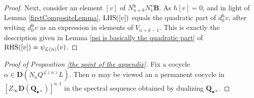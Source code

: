 \documentclass[11pt]{amsart} \renewcommand{\baselinestretch}{1.2}
\theoremstyle{plain}
\numberwithin{equation}{section} %
\theoremstyle{plain}
\numberwithin{equation}{chapter} %
\newcommand{\calL}{\mathcal{L}}
\newcommand{\EZ}[5]{[Z^{#1}_{#2}#3]^{#4}_{#5}}
\newcommand{\uver}{^\mathrm{v}}
\newcommand{\uhor}{^\mathrm{h}}
\newcommand{\dual}{\mathbf{D}}
\begin{document}
\begin{appendices}
\begin{proof}
Next, consider an element $[v]$ of $N\uhor_{n+k}N\uver_1\textbf{B}$. As $h[v]=0$, and in light of Lemma \ref{firstCompositeLemma}, $\textup{LHS}([v])$ equals the quadratic part of $d\uhor_0v$, after writing $d\uhor_0v$ as an expression in elements of $V_{n+k-1}$. This is exactly the description given in Lemma \ref{psi is basically the quadratic part} of $\textup{RHS}([v])=\psi_{\calL(n)}(v)$.
\end{proof}
\begin{proof}[Proof of Proposition \ref{the point of the appendix}]
Fix a cocycle $\alpha\in \dual(N_{n}Q^{\calL(n)} L)$. %
Then $\alpha$ may be viewed an a permanent cocycle in $\EZ{}{\infty}{\dual(\textbf{Q}_{\bullet*})}{n,1}{}$ in the spectral sequence obtained by dualizing $\textbf{Q}_{\bullet*}$. 


\end{proof}
\end{appendices}
\end{document}
